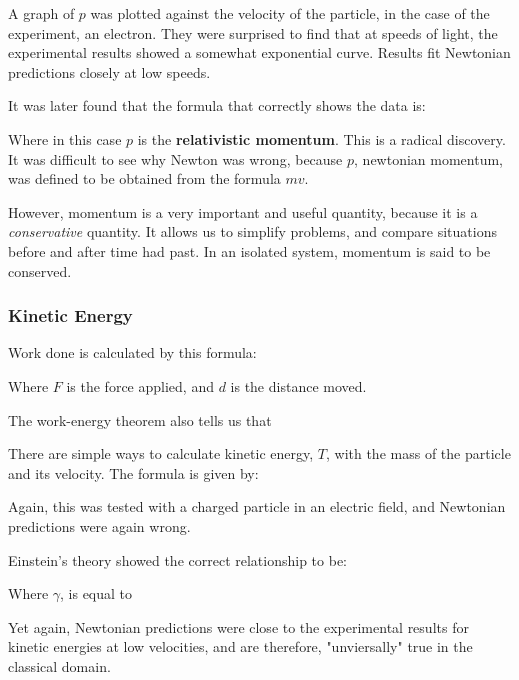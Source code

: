
A graph of $p$ was plotted against the velocity of the particle, in the case of the experiment, an electron. They were surprised to find that at speeds of light, the experimental results showed a somewhat exponential curve. Results fit Newtonian predictions closely at low speeds.

It was later found that the formula that correctly shows the data is:

Where in this case $p$ is the \textbf{relativistic momentum}. This is a radical discovery. It was difficult to see why Newton was wrong, because $p$, newtonian momentum, was defined to be obtained from the formula $mv$.

However, momentum is a very important and useful quantity, because it is a \textit{conservative} quantity. It allows us to simplify problems, and compare situations before and after time had past. In an isolated system, momentum is said to be conserved.

\subsubsection{Kinetic Energy}
Work done is calculated by this formula:

Where $F$ is the force applied, and $d$ is the distance moved.

The work-energy theorem also tells us that

There are simple ways to calculate kinetic energy, $T$, with the mass of the particle and its velocity. The formula is given by:

Again, this was tested with a charged particle in an electric field, and Newtonian predictions were again wrong.

Einstein's theory showed the correct relationship to be:

Where $\gamma$, is equal to 

Yet again, Newtonian predictions were close to the experimental results for kinetic energies at low velocities, and are therefore, "unviersally" true in the classical domain.

